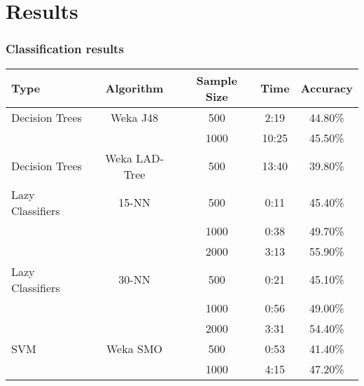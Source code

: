 \section{Results} %
\begin{frame}\frametitle{Classification results} 
\begin{tabular}{|p{3cm}|c|c|c|c|}
\hline
Type     &       Algorithm    & Sample Size &  Time &  Accuracy   \\ \hline
\hline
Decision Trees & Weka J48      &   500  &   2:19  &    44.80\%  \\
                              &&  1000  &  10:25  &    45.50\%  \\
Decision Trees & Weka LAD-Tree &   500  &  13:40  &    39.80\%  \\

Lazy Classifiers & 15-NN  &   500  &   0:11  &    45.40\%  \\
                              &&  1000  &   0:38  &    49.70\%  \\
                              &&  2000  &   3:13  &    55.90\%  \\

Lazy Classifiers & 30-NN  &   500  &   0:21  &    45.10\%  \\
                              &&  1000  &   0:56  &    49.00\%  \\
                              &&  2000  &   3:31  &    54.40\%  \\


SVM & Weka SMO &   500  &  0:53  &    41.40\%  \\
                                     &&  1000  &  4:15  &    47.20\%  \\
\hline
\end{tabular}
\end{frame}

